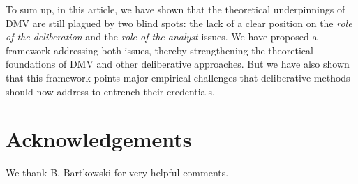 \documentclass[version=3.21, pagesize, twoside=off, bibliography=totoc, DIV=calc, fontsize=12pt, a4paper, french, english]{scrartcl}
\newenvironment{acknowledgements}{
	\section*{Acknowledgements}
}{
}
\begin{document}
To sum up, in this article, we have shown that the theoretical underpinnings of DMV are still plagued by two blind spots: the lack of a clear position on the \emph{role of the deliberation} and the \emph{role of the analyst} issues. We have proposed a framework addressing both issues, thereby strengthening the theoretical foundations of DMV and other deliberative approaches.  But we have also shown that this framework points major empirical challenges that deliberative methods should now address to entrench their credentials.


\begin{acknowledgements}
We thank B. Bartkowski for very helpful comments.
\end{acknowledgements}



\end{document}
